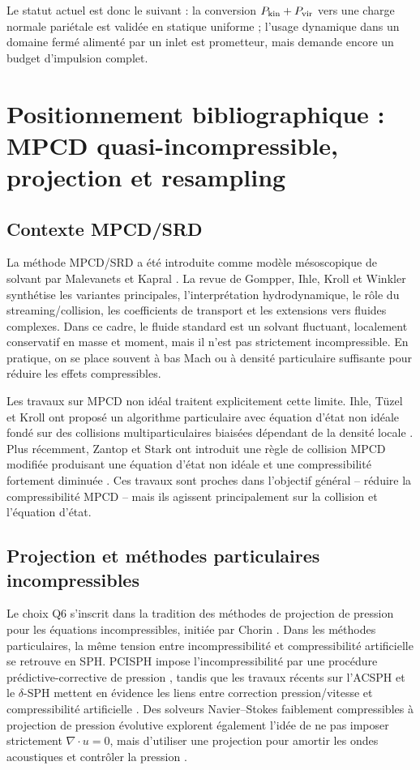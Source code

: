 \documentclass[11pt,a4paper]{article}
\begin{document}
Le statut actuel est donc le suivant : la conversion \(P_{\rm kin}+P_{\rm vir}\) vers une charge normale pariétale est validée en statique uniforme ; l'usage dynamique dans un domaine fermé alimenté par un inlet est prometteur, mais demande encore un budget d'impulsion complet.

\section{Positionnement bibliographique : MPCD quasi-incompressible, projection et resampling}

\subsection{Contexte MPCD/SRD}

La méthode MPCD/SRD a été introduite comme modèle mésoscopique de solvant par Malevanets et Kapral \cite{MalevanetsKapral1999}. La revue de Gompper, Ihle, Kroll et Winkler \cite{GompperIhleKrollWinkler2009} synthétise les variantes principales, l'interprétation hydrodynamique, le rôle du streaming/collision, les coefficients de transport et les extensions vers fluides complexes. Dans ce cadre, le fluide standard est un solvant fluctuant, localement conservatif en masse et moment, mais il n'est pas strictement incompressible. En pratique, on se place souvent à bas Mach ou à densité particulaire suffisante pour réduire les effets compressibles.

Les travaux sur MPCD non idéal traitent explicitement cette limite. Ihle, Tüzel et Kroll ont proposé un algorithme particulaire avec équation d'état non idéale fondé sur des collisions multiparticulaires biaisées dépendant de la densité locale \cite{IhleTuzelKroll2006}. Plus récemment, Zantop et Stark ont introduit une règle de collision MPCD modifiée produisant une équation d'état non idéale et une compressibilité fortement diminuée \cite{ZantopStark2021a,ZantopStark2021b}. Ces travaux sont proches dans l'objectif général -- réduire la compressibilité MPCD -- mais ils agissent principalement sur la collision et l'équation d'état.

\subsection{Projection et méthodes particulaires incompressibles}

Le choix Q6 s'inscrit dans la tradition des méthodes de projection de pression pour les équations incompressibles, initiée par Chorin \cite{Chorin1968}. Dans les méthodes particulaires, la même tension entre incompressibilité et compressibilité artificielle se retrouve en SPH. PCISPH impose l'incompressibilité par une procédure prédictive-corrective de pression \cite{SolenthalerPajarola2009}, tandis que les travaux récents sur l'ACSPH et le \(\delta\)-SPH mettent en évidence les liens entre correction pression/vitesse et compressibilité artificielle \cite{DeCourcy2024}. Des solveurs Navier--Stokes faiblement compressibles à projection de pression évolutive explorent également l'idée de ne pas imposer strictement \(\nabla\cdot u=0\), mais d'utiliser une projection pour amortir les ondes acoustiques et contrôler la pression \cite{Yang2021}.
\end{document}
